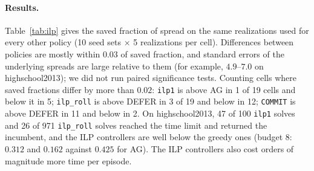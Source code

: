 \documentclass[ASNA,number]{USG}
\begin{document}
\paragraph{Results.} Table~\ref{tab:ilp} gives the saved fraction of spread on
the same realizations used for every other policy (10 seed sets $\times$ 5
realizations per cell). Differences between policies are mostly within $0.03$
of saved fraction, and standard errors of the underlying spreads are large
relative to them (for example, $4.9$--$7.0$ on highschool2013); we did not run
paired significance tests. Counting cells where saved fractions differ by more than $0.02$:
\texttt{ilp1} is above AG in 1 of 19 cells and below it in 5; \texttt{ilp\_roll}
is above DEFER in 3 of 19 and below in 12; \texttt{COMMIT} is above DEFER in 11
and below in 2. On highschool2013, 47 of 100 \texttt{ilp1} solves and 26 of 971
\texttt{ilp\_roll} solves reached the time limit and returned the incumbent, and
the ILP controllers are well below the greedy ones (budget $8$: $0.312$ and
$0.162$ against $0.425$ for AG). The ILP controllers also cost orders of
magnitude more time per episode.
\end{document}
